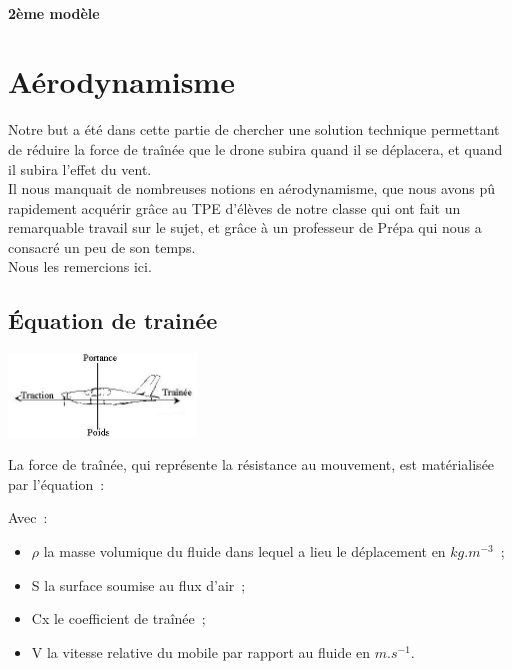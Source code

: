 \documentclass[a4paper,11pt]{article}
\begin{document}
\paragraph{2ème modèle}


\newpage

\section{Aérodynamisme}
	Notre but a été dans cette partie de chercher une solution technique permettant de réduire la force de traînée que le drone subira quand il se déplacera, et quand il subira l'effet du vent. \\
	Il nous manquait de nombreuses notions en aérodynamisme, que nous avons pû rapidement acquérir grâce au TPE d'élèves de notre classe qui ont fait un remarquable travail sur le sujet, et grâce à un professeur de Prépa qui nous a consacré un peu de son temps.\\
	Nous les remercions ici.
\subsection{Équation de trainée}
	\begin{center}
		\includegraphics[width=5cm]{../Images/portance.jpg}
	\end{center}
	La force de traînée, qui représente la résistance au mouvement, est matérialisée par l'équation~:\\
  \begin{center}
  \end{center}
  Avec~:
  \begin{itemize}
   \item $\rho$ la masse volumique du fluide dans lequel a lieu le déplacement en $kg.m^{-3}$~;
   \item S la surface soumise au flux d'air~;
   \item Cx le coefficient de traînée~;
   \item V la vitesse relative du mobile par rapport au fluide en $m.s^{-1}$.
  \end{itemize}
\end{document}
